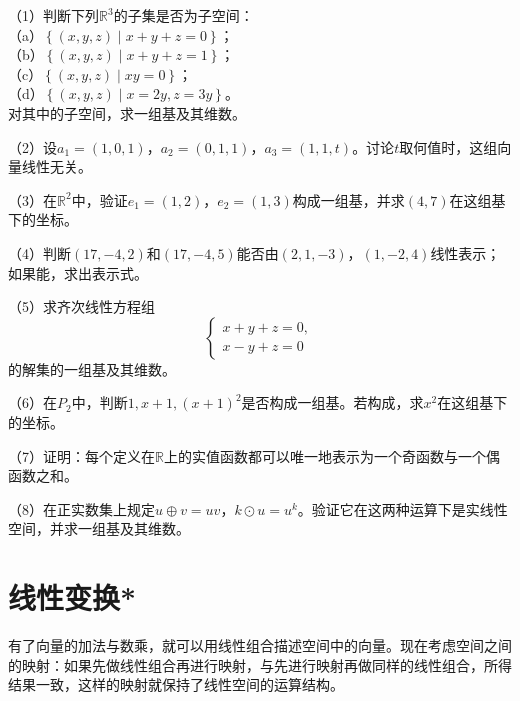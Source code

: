 \begin{exercise}
（1）判断下列\(\mathbb{R}^{3}\)的子集是否为子空间：\\
（a）\(\left\{ \left( x , y , z \right) \mid x + y + z = 0 \right\}\)；\\
（b）\(\left\{ \left( x , y , z \right) \mid x + y + z = 1 \right\}\)；\\
（c）\(\left\{ \left( x , y , z \right) \mid x y = 0 \right\}\)；\\
（d）\(\left\{ \left( x , y , z \right) \mid x = 2 y , z = 3 y \right\}\)。\\
对其中的子空间，求一组基及其维数。

（2）设\(a_{1} = \left( 1 , 0 , 1 \right)\)，\(a_{2} = \left( 0 , 1 , 1 \right)\)，\(a_{3} = \left( 1 , 1 , t \right)\)。讨论\(t\)取何值时，这组向量线性无关。

（3）在\(\mathbb{R}^{2}\)中，验证\(e_{1} = \left( 1 , 2 \right)\)，\(e_{2} = \left( 1 , 3 \right)\)构成一组基，并求\(\left( 4 , 7 \right)\)在这组基下的坐标。

（4）判断\(\left( 17 , - 4 , 2 \right)\)和\(\left( 17 , - 4 , 5 \right)\)能否由\(\left( 2 , 1 , - 3 \right)\)，\(\left( 1 , - 2 , 4 \right)\)线性表示；如果能，求出表示式。

（5）求齐次线性方程组
\begin{equation}
    \left\{ \begin{matrix}x + y + z = 0 , \\ x - y + z = 0\end{matrix} \right.
\end{equation}
的解集的一组基及其维数。

（6）在\(P_{2}\)中，判断\(1 , x + 1 , \left( x + 1 \right)^{2}\)是否构成一组基。若构成，求\(x^{2}\)在这组基下的坐标。

（7）证明：每个定义在\(\mathbb{R}\)上的实值函数都可以唯一地表示为一个奇函数与一个偶函数之和。

（8）在正实数集上规定\(u \oplus v = u v\)，\(k \odot u = u^{k}\)。验证它在这两种运算下是实线性空间，并求一组基及其维数。
\end{exercise}
\newpage

\section{线性变换*}
有了向量的加法与数乘，就可以用线性组合描述空间中的向量。现在考虑空间之间的映射：如果先做线性组合再进行映射，与先进行映射再做同样的线性组合，所得结果一致，这样的映射就保持了线性空间的运算结构。

